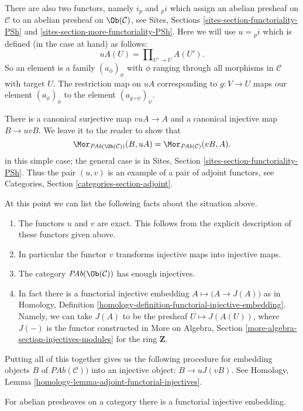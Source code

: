 \medskip\noindent
There are also two functors, namely $i_p$ and ${}_pi$
which assign an abelian presheaf on $\mathcal{C}$
to an abelian presheaf on $\Ob(\mathcal{C})$, see
Sites, Sections \ref{sites-section-functoriality-PSh} and
\ref{sites-section-more-functoriality-PSh}.
Here we will use $u = {}_pi$ which is defined (in the case at hand)
as follows:
$$
uA(U) = \prod\nolimits_{U' \to U} A(U').
$$
So an element is a family $(a_\phi)_\phi$ with $\phi$
ranging through all morphisms in $\mathcal{C}$ with target $U$.
The restriction map on $uA$ corresponding to $g : V \to U$
maps our element $(a_\phi)_\phi$ to the element
$(a_{g \circ \psi})_\psi$.

\medskip\noindent
There is a canonical surjective map $vuA \to A$ and a canonical
injective map $B \to uvB$. We leave it to the reader to show that
$$
\Mor_{\textit{PAb}(\Ob(\mathcal{C}))}(B, uA)
=
\Mor_{\textit{PAb}(\mathcal{C})}(vB, A).
$$
in this simple case; the general case is in
Sites, Section \ref{sites-section-functoriality-PSh}.
Thus the pair $(u, v)$ is an example of a pair of adjoint
functors, see
Categories, Section \ref{categories-section-adjoint}.

\medskip\noindent
At this point we can list the following facts
about the situation above.
\begin{enumerate}
\item The functors $u$ and $v$ are exact. This follows from
the explicit description of these functors given above.
\item In particular the functor $v$ transforms injective maps
into injective maps.
\item The category $\textit{PAb}(\Ob(\mathcal{C}))$
has enough injectives.
\item In fact there is a functorial injective embedding
$A \mapsto \big(A \to J(A)\big)$ as in
Homology, Definition \ref{homology-definition-functorial-injective-embedding}.
Namely, we can take $J(A)$ to be the
presheaf $U\mapsto J(A(U))$, where
$J(-)$ is the functor constructed in
More on Algebra, Section \ref{more-algebra-section-injectives-modules}
for the ring $\mathbf{Z}$.
\end{enumerate}
Putting all of this together gives us the following procedure
for embedding objects $B$ of $\textit{PAb}(\mathcal{C}))$ into
an injective object: $B \to uJ(vB)$. See
Homology, Lemma \ref{homology-lemma-adjoint-functorial-injectives}.

\begin{proposition}
\label{proposition-presheaves-injectives}
For abelian presheaves on a category there is a functorial injective
embedding.
\end{proposition}

